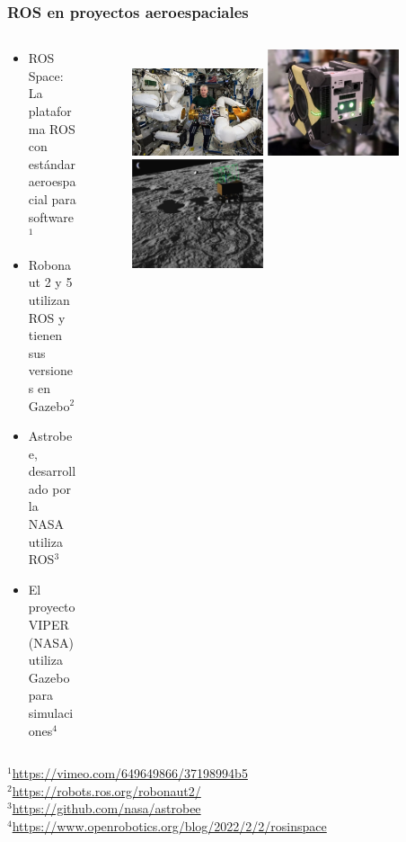 \documentclass[10pt,spanish,aspectratio=1610]{beamer}
\begin{document}
\begin{frame}\frametitle{ROS en proyectos aeroespaciales}
  \begin{columns}
    \begin{column}{0.5\textwidth}
      \begin{itemize}
      \item ROS Space: La plataforma ROS con estándar aeroespacial para software$^1$
      \item Robonaut 2 y 5 utilizan ROS y tienen sus versiones en Gazebo$^2$
      \item Astrobee, desarrollado por la NASA utiliza ROS$^3$
      \item El proyecto VIPER (NASA) utiliza Gazebo para simulaciones$^4$ 
      \end{itemize}
    \end{column}
    \begin{column}{0.5\textwidth}
      \begin{figure}
        \centering
        \includegraphics[width=0.45\textwidth]{Figures/ROSRobonaut.png}
        \includegraphics[width=0.45\textwidth]{Figures/ROSAstrobee.png}
        \includegraphics[width=0.45\textwidth]{Figures/ROSViper.png}
      \end{figure}
    \end{column}
  \end{columns}
  $^1$\footnotesize{\url{https://vimeo.com/649649866/37198994b5}}\\
  $^2$\footnotesize{\url{https://robots.ros.org/robonaut2/}}\\
  $^3$\footnotesize{\url{https://github.com/nasa/astrobee}}\\
  $^4$\footnotesize{\url{https://www.openrobotics.org/blog/2022/2/2/rosinspace}}
\end{frame}
\end{document}
